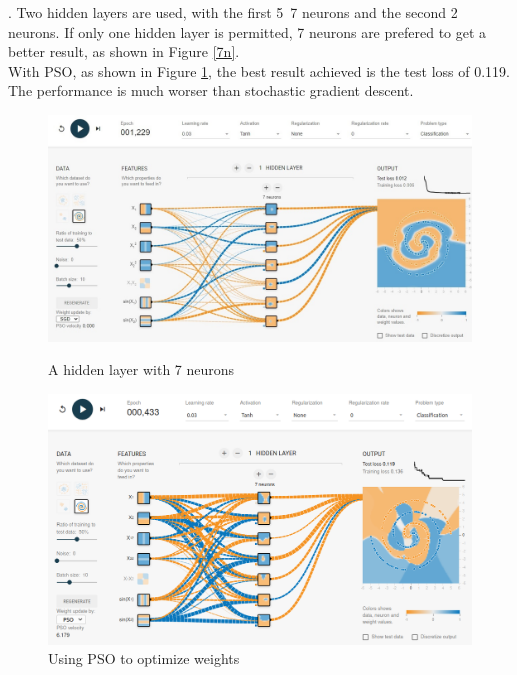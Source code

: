 \documentclass[12pt]{article}
\begin{document}
. Two hidden layers are used, with the first 5~7 neurons and the second 2 neurons. If only one hidden layer is permitted, 7 neurons are prefered to get a better result, as shown in Figure \ref{7n}.\\
With PSO, as shown in Figure \ref{pso_7n}, the best result achieved is the test loss of 0.119. The performance is much worser than stochastic gradient descent.
\begin{figure}[!ht]
\centering
\begin{minipage}[t]{0.48\textwidth}
    \centering
    \includegraphics[width=\textwidth]{1.jpg}
    \caption{A hidden layer with 7 neurons}
    \label{7n}
\end{minipage}
\begin{minipage}[t]{0.48\textwidth}
    \centering
    \includegraphics[width=\textwidth]{PSO.png}
    \caption{Using PSO to optimize weights}
    \label{pso_7n}
\end{minipage}
\end{figure}
\end{document}
